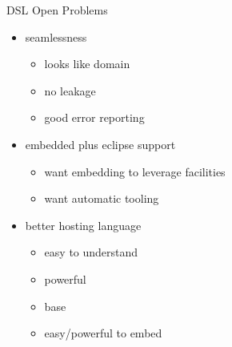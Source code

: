 \documentclass[xcolor=pdflatex,dvipsnames,table]{beamer}
\begin{document}
\begin{frame}[fragile]{DSL Open Problems}
\begin{itemize}
\item seamlessness
\begin{itemize}
\item looks like domain
\item no leakage 
\item good error reporting
\end{itemize}
\item embedded plus eclipse support
\begin{itemize}
\item want embedding to leverage facilities
\item want automatic tooling
\end{itemize}
\item better hosting language
\begin{itemize}
\item easy to understand
\item powerful
\item base
\item easy/powerful to embed
\end{itemize}
\end{itemize}
\end{frame}
\end{document}
